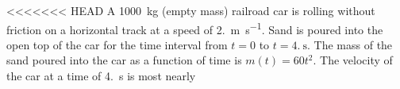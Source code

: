 \documentclass{../../oss-apphys-exam}
\begin{document}
\begin{multicols*}{2}
\begin{questions}
{{<<<<<<< HEAD
    \question A \SI{1000}{\kilo\gram} (empty mass) railroad car is rolling
    without friction on a horizontal track at a speed of
    \SI{2.}{\metre\per\second}. Sand is poured into the open top of the car for
    the time interval from $t=0$ to $t=\SI{4.}\second$. The mass of the sand
    poured into the car as a function of time is $m(t)=60t^2$. The velocity of
    the car at a time of \SI{4.}{\second} is most nearly
    \columnbreak
    
    }}
\end{questions}
\end{multicols*}
\end{document}

